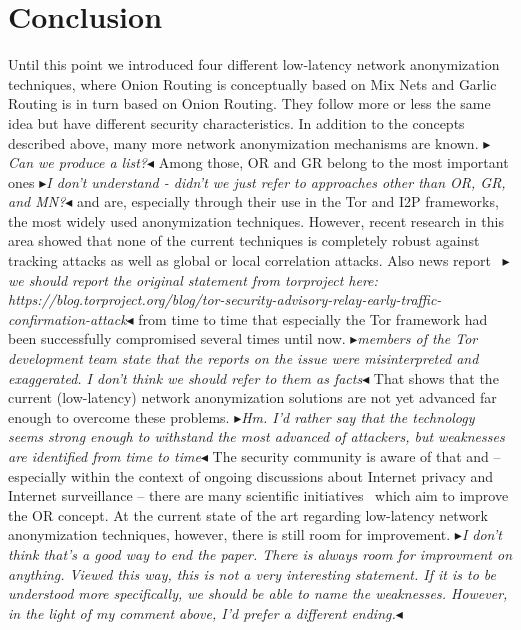 \documentclass{sig-alternate}
\newcommand{\boxedtext}[1]{\fbox{\scriptsize\bfseries\textsf{#1}}}
\newcommand{\nota}[2]{
   \boxedtext{#1}
       {\small$\blacktriangleright$\emph{\textsl{#2}}$\blacktriangleleft$}
}
\newcommand\fk[1]{\nota{FK}{#1}}
\begin{document}
\section{Conclusion}
Until this point we introduced four different low-latency network anonymization techniques, where Onion Routing is conceptually based on Mix Nets and Garlic Routing is in turn based on Onion Routing. They follow more or less the same idea but have different security characteristics. In addition to the concepts described above, many more network anonymization mechanisms are known.\fk{Can we produce a list?} Among those, OR and GR belong to the most important ones \fk{I don't understand - didn't we just refer to approaches other than OR, GR, and MN?}and are, especially through their use in the Tor and I2P frameworks, the most widely used anonymization techniques. However, recent research in this area showed that none of the current techniques is completely robust against tracking attacks as well as global or local correlation attacks. Also news report~\cite{torhacked}\fk{we should report the original statement from torproject here: https://blog.torproject.org/blog/tor-security-advisory-relay-early-traffic-confirmation-attack} from time to time that especially the Tor framework had been successfully compromised several times until now.\fk{members of the Tor development team state that the reports on the issue were misinterpreted and exaggerated. I don't think we should refer to them as facts} That shows that the current (low-latency) network anonymization solutions are not yet advanced far enough to overcome these problems.\fk{Hm. I'd rather say that the technology seems strong enough to withstand the most advanced of attackers, but weaknesses are identified from time to time} The security community is aware of that and -- especially within the context of ongoing discussions about Internet privacy and Internet surveillance -- there are many scientific initiatives~\cite{ORpublications} which aim to improve the OR concept. At the current state of the art regarding low-latency network anonymization techniques, however, there is still room for improvement.\fk{I don't think that's a good way to end the paper. There is always room for improvment on anything. Viewed this way, this is not a very interesting statement. If it is to be understood more specifically, we should be able to name the weaknesses. However, in the light of my comment above, I'd prefer a different ending.}

\newpage


\end{document}

